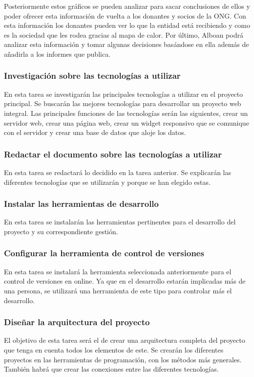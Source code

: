 Posteriormente estos gráficos se pueden analizar para sacar conclusiones de ellos y poder ofrecer esta información de vuelta a los donantes y socios de la ONG. Con esta información los donantes pueden ver lo que la entidad está recibiendo y como es la sociedad que les rodea gracias al mapa de calor. Por último, Alboan podrá analizar esta información y tomar algunas decisiones basándose en ella además de añadirla a los informes que publica.


\newpage

\subsubsection{Investigación sobre las tecnologías a utilizar}
En esta tarea se investigarán las principales tecnologías a utilizar en el proyecto principal. Se buscarán las mejores tecnologías para desarrollar un proyecto web integral. Las principales funciones de las tecnologías serán las siguientes, crear un servidor web, crear una página web, crear un widget responsivo que se comunique con el servidor y crear una base de datos que aloje los datos.

\subsubsection{Redactar el documento sobre las tecnologías a utilizar}
En esta tarea se redactará lo decidido en la tarea anterior. Se explicarán las diferentes tecnologías que se utilizarán y porque se han elegido estas.

\subsubsection{Instalar las herramientas de desarrollo}
En esta tarea se instalarán las herramientas pertinentes para el desarrollo del proyecto y su correspondiente gestión.

\subsubsection{Configurar la herramienta de control de versiones}
En esta tarea se instalará la herramienta seleccionada anteriormente para el control de versiones en online. Ya que en el desarrollo estarán implicadas más de una persona, se utilizará una herramienta de este tipo para controlar más el desarrollo.

\subsubsection{Diseñar la arquitectura del proyecto}
El objetivo de esta tarea será el de crear una arquitectura completa del proyecto que tenga en cuenta todos los elementos de este. Se crearán los diferentes proyectos en las herramientas de programación, con los métodos más generales. También habrá que crear las conexiones entre las diferentes tecnologías.

